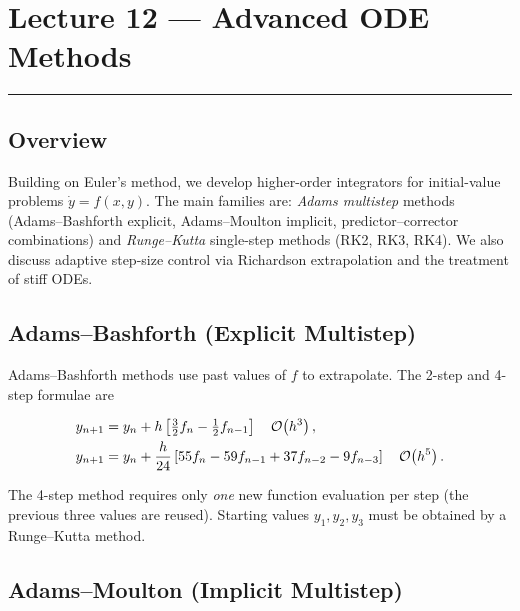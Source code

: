 
\section{Lecture 12 — Advanced ODE Methods}\label{sec:lec12}
\hrule\vspace{1.5em}

\subsection*{Overview}
Building on Euler's method, we develop higher-order integrators for
initial-value problems $\dot{y}=f(x,y)$.  The main families are:
\emph{Adams multistep} methods (Adams–Bashforth explicit,
Adams–Moulton implicit, predictor–corrector combinations) and
\emph{Runge–Kutta} single-step methods (RK2, RK3, RK4).
We also discuss adaptive step-size control via Richardson
extrapolation and the treatment of stiff ODEs.

\subsection{Adams--Bashforth (Explicit Multistep)}\label{subsec:lec12:ab}

Adams–Bashforth methods use past values of $f$ to extrapolate.
The 2-step and 4-step formulae are

\begin{align}
  y_{n+1} &= y_n + h\left[\tfrac{3}{2}f_n - \tfrac{1}{2}f_{n-1}\right]
  \quad \mathcal{O}\!\left(h^3\right),
  \label{eq:lec12:ab2}\\
  y_{n+1} &= y_n + \frac{h}{24}\left[55f_n - 59f_{n-1}
              + 37f_{n-2} - 9f_{n-3}\right]
  \quad \mathcal{O}\!\left(h^5\right).
  \label{eq:lec12:ab4}
\end{align}

The 4-step method requires only \emph{one} new function evaluation
per step (the previous three values are reused).  Starting values
$y_1,y_2,y_3$ must be obtained by a Runge–Kutta method.

\subsection{Adams--Moulton (Implicit Multistep)}\label{subsec:lec12:am}

